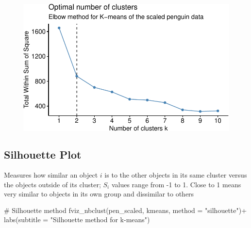 \documentclass[
  letterpaper,
  DIV=11,
  numbers=noendperiod]{scrreprt}
\newenvironment{Shaded}{\begin{snugshade}}{\end{snugshade}}
\newcommand{\AttributeTok}[1]{\textcolor[rgb]{0.40,0.45,0.13}{#1}}
\newcommand{\CommentTok}[1]{\textcolor[rgb]{0.37,0.37,0.37}{#1}}
\newcommand{\FunctionTok}[1]{\textcolor[rgb]{0.28,0.35,0.67}{#1}}
\newcommand{\NormalTok}[1]{\textcolor[rgb]{0.00,0.23,0.31}{#1}}
\newcommand{\SpecialCharTok}[1]{\textcolor[rgb]{0.37,0.37,0.37}{#1}}
\newcommand{\StringTok}[1]{\textcolor[rgb]{0.13,0.47,0.30}{#1}}
\begin{document}
\begin{figure}[H]

{\centering \includegraphics{./12-clustering_files/figure-pdf/unnamed-chunk-13-1.pdf}

}

\end{figure}

\hypertarget{silhouette-plot}{%
\subsection{Silhouette Plot}\label{silhouette-plot}}

Measures how similar an object \(i\) is to the other objects in its same
cluster versus the objects outside of its cluster; \(S_i\) values range
from -1 to 1. Close to 1 means very similar to objects in its own group
and dissimilar to others

\begin{Shaded}
\begin{Highlighting}[]
\CommentTok{\# Silhouette method}
\FunctionTok{fviz\_nbclust}\NormalTok{(pen\_scaled, kmeans, }\AttributeTok{method =} \StringTok{"silhouette"}\NormalTok{)}\SpecialCharTok{+} \FunctionTok{labs}\NormalTok{(}\AttributeTok{subtitle =} \StringTok{"Silhouette method for k{-}means"}\NormalTok{)}
\end{Highlighting}
\end{Shaded}
\end{document}
